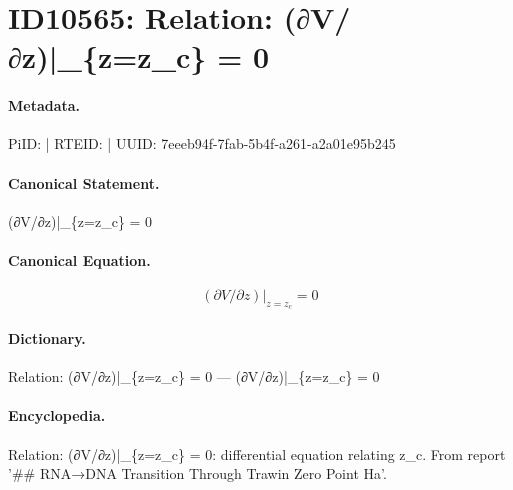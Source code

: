 \section*{ID10565: Relation: (∂V/∂z)|\_\{z=z\_c\} = 0}
\paragraph{Metadata.}
PiID:  | RTEID:  | UUID: 7eeeb94f-7fab-5b4f-a261-a2a01e95b245

\paragraph{Canonical Statement.}
(∂V/∂z)|\_\{z=z\_c\} = 0

\paragraph{Canonical Equation.}
\[
(∂V/∂z)|_{z=z_c} = 0
\]

\paragraph{Dictionary.}
Relation: (∂V/∂z)|\_\{z=z\_c\} = 0 — (∂V/∂z)|\_\{z=z\_c\} = 0

\paragraph{Encyclopedia.}
Relation: (∂V/∂z)|\_\{z=z\_c\} = 0: differential equation relating z\_c. From report '\#\# RNA→DNA Transition Through Trawin Zero Point Ha'.
